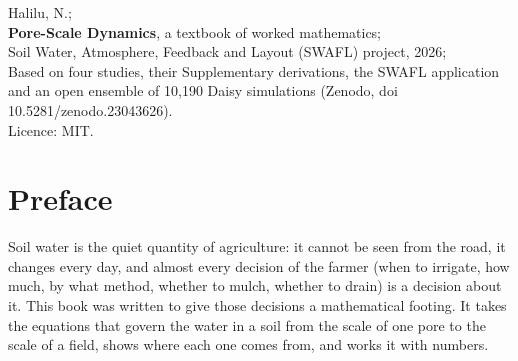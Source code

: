 \cleardoublepage
\thispagestyle{empty}\vspace*{0pt}
{\sffamily\fontsize{11}{15}\selectfont Halilu, N.;\\ \textbf{Pore-Scale Dynamics}, a textbook of worked mathematics;\\ Soil Water, Atmosphere, Feedback and Layout (SWAFL) project, 2026;\\ Based on four studies, their Supplementary derivations, the SWAFL application and an open ensemble of 10,190 Daisy simulations (Zenodo, doi 10.5281/zenodo.23043626).\\ Licence: MIT.}
\clearpage
\pagestyle{front}
\chapter*{Preface}
Soil water is the quiet quantity of agriculture: it cannot be seen from the road, it changes every day, and almost every decision of the farmer (when to irrigate, how much, by what method, whether to mulch, whether to drain) is a decision about it. This book was written to give those decisions a mathematical footing. It takes the equations that govern the water in a soil from the scale of one pore to the scale of a field, shows where each one comes from, and works it with numbers.

